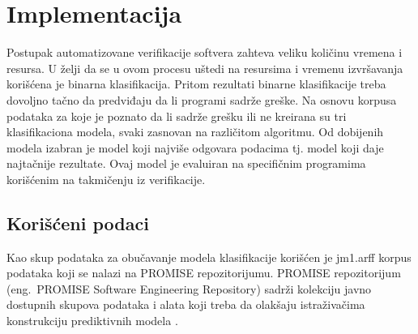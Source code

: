 \documentclass[12pt,oneside]{memoir}
\begin{document}



\chapter{Implementacija}

Postupak automatizovane verifikacije softvera zahteva veliku količinu vremena i resursa. 
U želji da se u ovom procesu uštedi na resursima i vremenu izvršavanja korišćena je binarna klasifikacija. Pritom rezultati binarne klasifikacije treba dovoljno tačno da predviđaju da li programi sadrže greške. Na osnovu korpusa podataka za koje je poznato da li sadrže grešku ili ne kreirana su tri klasifikaciona modela, svaki zasnovan na različitom algoritmu. Od dobijenih modela izabran je model koji najviše odgovara podacima tj. model koji daje najtačnije rezultate. Ovaj model je evaluiran na specifičnim programima korišćenim na takmičenju iz verifikacije. 

\section{Korišćeni podaci}
\label{kor_podaci}

Kao skup podataka za obučavanje modela klasifikacije korišćen je jm1.arff korpus podataka koji se nalazi na PROMISE repozitorijumu. PROMISE repozitorijum (eng.~PROMISE Software Engineering Repository) sadrži kolekciju javno dostupnih skupova podataka i alata koji treba da olakšaju istraživačima konstrukciju prediktivnih modela \cite{promise}. 
\end{document}

